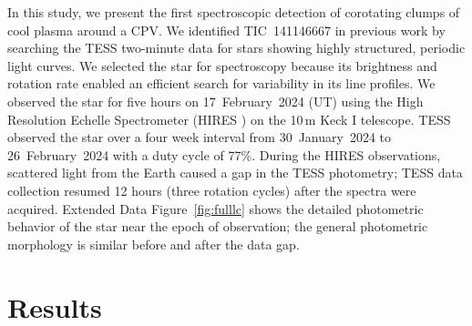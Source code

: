 \documentclass{nature3}
\begin{document}
In this study, we present the first spectroscopic detection of
corotating clumps of cool plasma around a CPV.  We identified
TIC~141146667 in previous work \cite{Bouma2024} by searching the TESS
two-minute data \cite{Ricker2015} for stars showing highly structured,
periodic light curves.  We selected the star for spectroscopy because
its brightness and rotation rate enabled an efficient search for 
variability in its line profiles.  We observed the star for five hours on
17~February~2024 (UT) using the High Resolution Echelle Spectrometer
(HIRES \cite{vogt_hires_1994}) on the 10\,m Keck I telescope.  TESS
observed the star over a four week interval from 30~January~2024 to
26~February~2024 with a duty cycle of 77\%.  During the HIRES
observations, scattered light from the Earth caused a gap in the TESS
photometry; TESS data collection resumed 12 hours (three rotation
cycles) after the spectra were acquired.  Extended Data
Figure~\ref{fig:fulllc} shows the detailed photometric behavior of the
star near the epoch of observation; the general photometric morphology
is similar before and after the data gap.


\section{Results}
\end{document}
